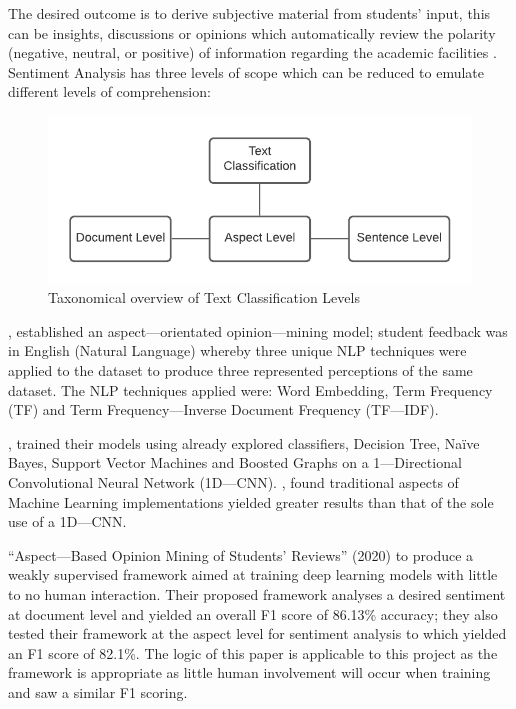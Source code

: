 The desired outcome is to derive subjective material from students’ input, this can be insights, discussions or opinions which automatically review the polarity (negative, neutral, or positive) of information regarding the academic facilities \parencite{kandhro2019student}. Sentiment Analysis has three levels of scope which can be reduced to emulate different levels of comprehension:

\begin{figure}[H]
    \centering
    \includegraphics[width=\textwidth]{figures/chapter-2/TextClassificationTaxonomy.pdf}
    \caption[Taxonomical overview of Text Classification Levels]{Taxonomical overview of Text Classification Levels}
\end{figure}

\newpage

\textcite{kastrati2020weakly}, established an aspect---orientated opinion---mining model; student feedback was in English (Natural Language)  whereby three unique NLP techniques were applied to the dataset to produce three represented perceptions of the same dataset. The NLP techniques applied were: Word Embedding, Term Frequency (TF) and Term Frequency---Inverse Document Frequency (TF---IDF).

\textcite{kastrati2020weakly}, trained their models using already explored classifiers, Decision Tree, Naïve Bayes, Support Vector Machines and Boosted Graphs on a 1---Directional Convolutional Neural Network (1D---CNN). \textcite{kastrati2020weakly}, found traditional aspects of Machine Learning implementations yielded greater results than that of the sole use of a 1D---CNN.

\textcite{kastrati2020aspect} “Aspect---Based Opinion Mining of Students' Reviews” (2020) to produce a weakly supervised framework aimed at training deep learning models with little to no human interaction. Their proposed framework analyses a desired sentiment at document level and yielded an overall F1 score of 86.13\%  accuracy; they also tested their framework at the aspect level for sentiment analysis to which yielded an F1 score of 82.1\%. The logic of this paper is applicable to this project as the framework is appropriate as little human involvement will occur when training and saw a similar F1 scoring.

